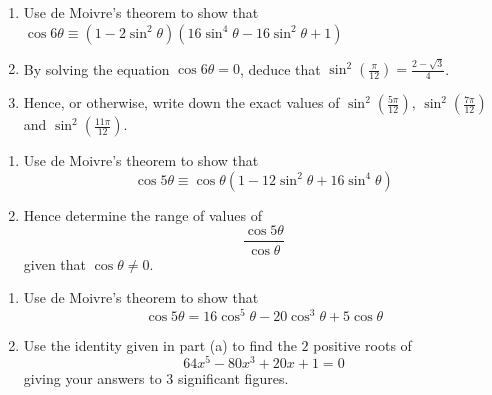 \documentclass[leqno]{article}
\begin{document}
\begin{enumerate}[
  label=\textbf{\arabic*.},
  leftmargin=*,
  topsep=0pt,
  partopsep=0pt,
  parsep=0pt
]
\begin{enumerate}[label=\textbf{(\alph*)}]
  \item Use de Moivre's theorem to show that $\cos 6\theta \equiv (1 - 2\sin^2\theta)(16\sin^4\theta - 16\sin^2\theta + 1)$  \\
  \item By solving the equation $\cos 6\theta = 0$, deduce that $\sin^2\left(\frac{\pi}{12}\right) = \frac{2 - \sqrt{3}}{4}$.  \\
  \item Hence, or otherwise, write down the exact values of $\sin^2\left(\frac{5\pi}{12}\right)$, $\sin^2\left(\frac{7\pi}{12}\right)$ and $\sin^2\left(\frac{11\pi}{12}\right)$.  \\
\end{enumerate}

\newpage

\questionitem

\begin{enumerate}[label=\textbf{(\roman*)}]
  \item Use de Moivre's theorem to show that
  \[
  \cos 5\theta \equiv \cos \theta \left(1 - 12\sin^2 \theta + 16\sin^4 \theta\right)
  \]
  \item Hence determine the range of values of
  \[
  \frac{\cos 5\theta}{\cos \theta}
  \]
  given that $\cos \theta \ne 0$.  \\
\end{enumerate}

\newpage

\questionitem

\begin{enumerate}[label=\textbf{(\alph*)}]
  \item Use de Moivre's theorem to show that
  \[
  \cos 5\theta = 16\cos^5 \theta - 20\cos^3 \theta + 5\cos \theta
  \]
  \item Use the identity given in part (a) to find the $2$ positive roots of
  \[
  64x^5 - 80x^3 + 20x + 1 = 0
  \]
  giving your answers to $3$ significant figures.  \\
\end{enumerate}

\newpage

\questionitem


\end{enumerate}
\end{document}
